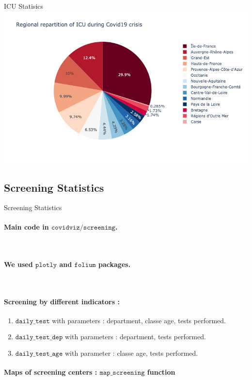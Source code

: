 \documentclass[11pt, compress, tikz, xcolor=table]{beamer}
\theoremstyle{definition}
\begin{document}
\begin{frame}[fragile]{ICU Statisics} 
       \centering
        \includegraphics[width= 12 cm]{images/pie_chart.png}\\

\end{frame}


\subsection{Screening Statistics}
\begin{frame}[fragile]{Screening Statistics} 
\paragraph{Main code in $\texttt{covidviz/screening}$.}\\
\paragraph{We used $\texttt{plotly}$ and  $\texttt{folium}$ packages.}\\
\paragraph{Screening by different indicators :}
 \begin{enumerate}
    \item $\texttt{daily\_test}$ with parameters : department, classe age, tests performed.
    \item $\texttt{daily\_test\_dep}$ with parameters : department, tests performed.
    \item $\texttt{daily\_test\_age}$
    with parameter : classe age, tests performed.
 \end{enumerate}
 
 \paragraph{Maps of screening centers : $\texttt{map\_screening}$ function}
\end{frame}
\end{document}
